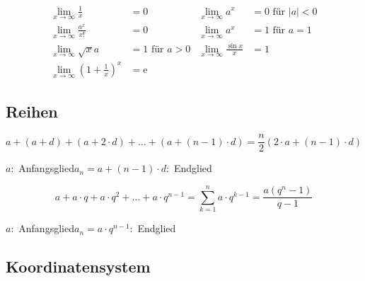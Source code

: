 \begin{shaded}
 \begin{align}
\lim_{x \to \infty}\frac{1}{x}&=0 & \lim_{x \to \infty}a^x&=0 \text{ für } |a|<0 \\
\lim_{x \to \infty}\frac{a^x}{x!}&=0 & \lim_{x \to \infty}a^x&=1 \text{ für } a=1 \\
\lim_{x \to \infty}\sqrt{x}{a}&=1\text{ für } a>0& \lim_{x \to \infty}\frac{\sin x}{x}&=1\\
\lim_{x \to \infty}\left(1+\frac{1}{x}\right)^x&=\mathrm{e}
\end{align}
\end{shaded}

\subsection{Reihen}
\begin{shaded}
 \begin{equation}
  a+(a+d)+(a+2\cdot d)+\ldots+(a+(n-1)\cdot d)=\frac{n}{2}\left(2\cdot a+(n-1)\cdot d\right)
 \end{equation}
\end{shaded}
$a:$ Anfangsglied\quad $a_n=a+(n-1)\cdot d:$ Endglied
\begin{shaded}
 \begin{equation}
  a+a\cdot q +a\cdot q^2+\ldots+a\cdot q^{n-1}=\sum_{k=1}^n a\cdot q^{k-1}=\frac{a(q^n-1)}{q-1}
 \end{equation}
\end{shaded}
$a:$ Anfangsglied\quad $a_n=a\cdot q^{n-1}:$ Endglied

\subsection{Koordinatensystem}

